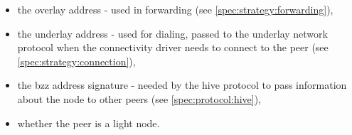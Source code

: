\begin{itemize}
    \item the overlay address - used in forwarding  (see  \ref{spec:strategy:forwarding}),
    \item the underlay address - used for dialing, passed to the underlay network protocol when the connectivity driver needs to connect to the peer (see \ref{spec:strategy:connection}),
    \item the bzz address signature - needed by the hive protocol to pass information about the node to other peers (see \ref{spec:protocol:hive}),
    \item whether the peer is a light node.
\end{itemize}


